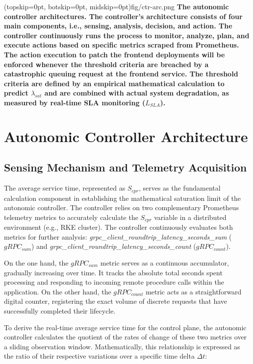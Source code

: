\documentclass{ieeeaccess}
\begin{document}
\Figure[t!](topskip=0pt, botskip=0pt, midskip=0pt){fig/ctr-arc.png}
{ 
	\textbf{The autonomic controller architectures. The controller's architecture consists of four main components, i.e., sensing, analysis, decision, and action. The controller continuously runs the process to monitor, analyze, plan, and execute actions based on specific metrics scraped from Prometheus. The action execution to patch the frontend deployments will be enforced whenever the threshold criteria are breached by a catastrophic queuing request at the frontend service. The threshold criteria are defined by an empirical mathematical calculation to predict $\lambda_{sat}$ and are combined with actual system degradation, as measured by real-time SLA monitoring ($L_{SLA}$). }
	\label{fig:ctr-arc}
}

\section{Autonomic Controller Architecture}
\label{sec:auto-ctr}

\subsection{Sensing Mechanism and Telemetry Acquisition}
\label{sec3.1}
The average service time, represented as $S_{cpr}$, serves as the fundamental calculation component in establishing the mathematical saturation limit of the autonomic controller. The controller relies on two complementary Prometheus telemetry metrics to accurately calculate the $S_{cpr}$ variable in a distributed environment (e.g., RKE cluster). The controller continuously evaluates both metrics for further analysis: \textit{grpc\_client\_roundtrip\_latency\_seconds\_sum} ($gRPC_{sum}$) and \textit{grpc\_client\_roundtrip\_latency\_seconds\_count} ($gRPC_{count}$).

On the one hand, the $gRPC_{sum}$ metric serves as a continuous accumulator, gradually increasing over time. It tracks the absolute total seconds spent processing and responding to incoming remote procedure calls within the application. On the other hand, the $gRPC_{count}$ metric acts as a straightforward digital counter, registering the exact volume of discrete requests that have successfully completed their lifecycle. 

To derive the real-time average service time for the control plane, the autonomic controller calculates the quotient of the rates of change of these two metrics over a sliding observation window. Mathematically, this relationship is expressed as the ratio of their respective variations over a specific time delta $\Delta t$:
\end{document}
